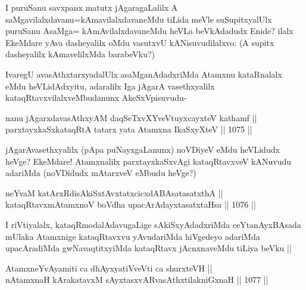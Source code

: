 \begin{artha}
I puruSanu savxpanx matutx jAgaragaLalilx A saMgavilalxdavanu=kAmavilalxdavaneMdu tiLida meVle suSupitxyalUlx puruSanu AsaMga= kAmAvilalxdavaneMdu heVLa beVkAdadudx Enide? ilalx EkeMdare yAva dasheyalilx oMdu vasutxvU kANisuvudilalxvo: (A supitx dasheyalilx kAmavelilxMda barabeVku?)
\end{artha}

\begin{artha}
IvaregU avasAthxtarxyadalUlx asaMganAdadxriMda Atamxnu kataRnalalx eMdu heVLidAdxyitu, adaralilx Iga jAgarA vasethxyalilx kataqRtavxvilalxveMbudanunx AkeSxVpisuvudu-
\end{artha}


\begin{shl}
nanu jAgarxdavasAthxyAM daqSeTxvXYveVtuyxcayxteV kathamf || \\
parxtayxkaSxkataqRtA tatarx yata Atamxna IkaSxyXteV ||  1075 ||  
\end{shl}

\begin{artha}
jAgarAvasethxyalilx (pApa puNayxgaLanunx) noVDiyeV eMdu heVLidudx heVge? EkeMdare! Atamxnalilx parxtayxkaSxvAgi kataqRtavxveV kANuvudu adariMda (noVDidudx mAtarxveV eMbudu heVge?)
\end{artha}


\begin{shl}
neYvaM katArxRdisAkiSxtAvxtatxcicxdABAsatasatxthA || \\
kataqRtavxmAtamxnoV boVdha upacArAdayxtasatxtaHsa ||  1076 ||  
\end{shl}

\begin{artha}
I riVtiyalalx, kataqRmodalAdavugaLige sAkiSxyAdadxriMda ceYtanAyxBAsada mUlaka Atamxnige kataqRtavxvu yAvudariMda hiVgedeyo adariMda upacAradiMda gwNavaqtitxyiMda kataqRtavx jAcnxnaveMdu tiLiya beVku ||
\end{artha}


\begin{shl}
AtamxneYvAyamiti ca dhAyxyatiVveVti ca shurxteVH || \\
nA\s \s tamxnaH kArakatavxM sAyxtasxvARvasAthxtilakniGxnaH ||  1077 || 
\end{shl}


